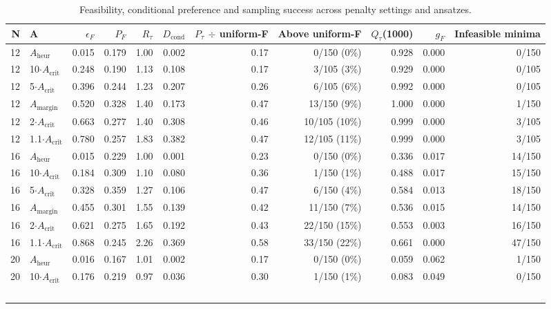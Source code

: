 \documentclass[journal]{IEEEtran}
\begin{document}
\begin{table}[!t]
\centering
\scriptsize
\caption{Feasibility, conditional preference and sampling success across penalty settings and ansatzes.}
\label{tab:III}
\begin{tabular}{rlrrrrrrrrr}
\toprule
N & A & $\epsilon_{F}$ & $P_{F}$ & $R_{\tau}$ & $D_{\mathrm{cond}}$ & $P_{\tau}$ $\div$ uniform-F & Above uniform-F & $Q_{\tau}$(1000) & $g_{F}$ & Infeasible minima \\
\midrule
12 & $A_{\mathrm{heur}}$ & 0.015 & 0.179 & 1.00 & 0.002 & 0.17 & 0/150 (0\%) & 0.928 & 0.000 & 0/150 \\
12 & 10$\cdot$$A_{\mathrm{crit}}$ & 0.248 & 0.190 & 1.13 & 0.108 & 0.17 & 3/105 (3\%) & 0.929 & 0.000 & 0/105 \\
12 & 5$\cdot$$A_{\mathrm{crit}}$ & 0.396 & 0.244 & 1.23 & 0.207 & 0.26 & 6/105 (6\%) & 0.992 & 0.000 & 0/105 \\
12 & $A_{\mathrm{margin}}$ & 0.520 & 0.328 & 1.40 & 0.173 & 0.47 & 13/150 (9\%) & 1.000 & 0.000 & 1/150 \\
12 & 2$\cdot$$A_{\mathrm{crit}}$ & 0.663 & 0.277 & 1.40 & 0.308 & 0.46 & 10/105 (10\%) & 0.999 & 0.000 & 3/105 \\
12 & 1.1$\cdot$$A_{\mathrm{crit}}$ & 0.780 & 0.257 & 1.83 & 0.382 & 0.47 & 12/105 (11\%) & 0.999 & 0.000 & 3/105 \\
16 & $A_{\mathrm{heur}}$ & 0.015 & 0.229 & 1.00 & 0.001 & 0.23 & 0/150 (0\%) & 0.336 & 0.017 & 14/150 \\
16 & 10$\cdot$$A_{\mathrm{crit}}$ & 0.184 & 0.309 & 1.10 & 0.080 & 0.36 & 1/150 (1\%) & 0.488 & 0.017 & 15/150 \\
16 & 5$\cdot$$A_{\mathrm{crit}}$ & 0.328 & 0.359 & 1.27 & 0.106 & 0.47 & 6/150 (4\%) & 0.584 & 0.013 & 18/150 \\
16 & $A_{\mathrm{margin}}$ & 0.455 & 0.301 & 1.55 & 0.139 & 0.42 & 11/150 (7\%) & 0.536 & 0.015 & 14/150 \\
16 & 2$\cdot$$A_{\mathrm{crit}}$ & 0.621 & 0.275 & 1.65 & 0.192 & 0.43 & 22/150 (15\%) & 0.553 & 0.003 & 16/150 \\
16 & 1.1$\cdot$$A_{\mathrm{crit}}$ & 0.868 & 0.245 & 2.26 & 0.369 & 0.58 & 33/150 (22\%) & 0.661 & 0.000 & 47/150 \\
20 & $A_{\mathrm{heur}}$ & 0.016 & 0.167 & 1.01 & 0.002 & 0.17 & 0/150 (0\%) & 0.059 & 0.062 & 1/150 \\
20 & 10$\cdot$$A_{\mathrm{crit}}$ & 0.176 & 0.219 & 0.97 & 0.036 & 0.30 & 1/150 (1\%) & 0.083 & 0.049 & 0/150 \\
$$
\end{tabular}
\end{table}
\end{document}
